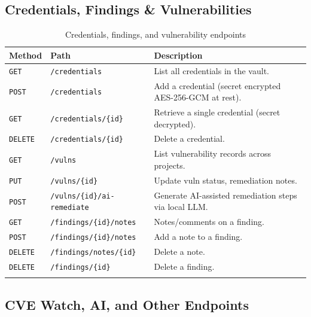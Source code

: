 \documentclass[11pt,a4paper,twoside,openright]{book}
\newcommand{\mget}{\colorbox{SeraphLow}{\color{white}\texttt{\footnotesize GET}}}
\newcommand{\mpost}{\colorbox{SeraphAccent}{\color{SeraphBg}\texttt{\footnotesize POST}}}
\newcommand{\mput}{\colorbox{SeraphCyan}{\color{SeraphBg}\texttt{\footnotesize PUT}}}
\newcommand{\mdelete}{\colorbox{SeraphCrit}{\color{white}\texttt{\footnotesize DELETE}}}
\begin{document}
\subsection{Credentials, Findings \& Vulnerabilities}

\begin{longtable}{L{1.2cm} L{6cm} X}
\toprule
\textbf{Method} & \textbf{Path} & \textbf{Description} \\
\midrule
\endhead
\mget    & \texttt{/credentials}              & List all credentials in the vault. \\
\mpost   & \texttt{/credentials}              & Add a credential (secret encrypted AES-256-GCM at rest). \\
\mget    & \texttt{/credentials/\{id\}}       & Retrieve a single credential (secret decrypted). \\
\mdelete & \texttt{/credentials/\{id\}}       & Delete a credential. \\
\mget    & \texttt{/vulns}                    & List vulnerability records across projects. \\
\mput    & \texttt{/vulns/\{id\}}             & Update vuln status, remediation notes. \\
\mpost   & \texttt{/vulns/\{id\}/ai-remediate}& Generate AI-assisted remediation steps via local LLM. \\
\mget    & \texttt{/findings/\{id\}/notes}    & Notes/comments on a finding. \\
\mpost   & \texttt{/findings/\{id\}/notes}    & Add a note to a finding. \\
\mdelete & \texttt{/findings/notes/\{id\}}    & Delete a note. \\
\mdelete & \texttt{/findings/\{id\}}          & Delete a finding. \\
\bottomrule
\caption{Credentials, findings, and vulnerability endpoints}
\end{longtable}

\subsection{CVE Watch, AI, and Other Endpoints}
\end{document}
